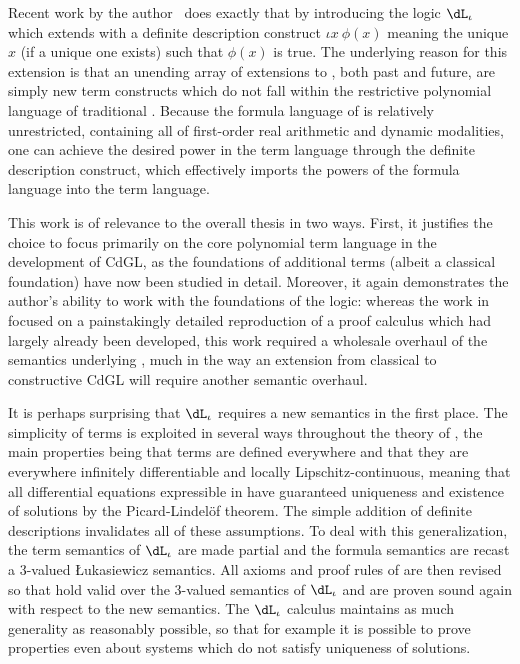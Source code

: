 \documentclass[12pt]{cmuthesis}
\theoremstyle{definition}
\theoremstyle{remark}
\newcommand{\meps}[2]{\iota{#1}~{#2}}
\newcommand{\rref}[2][]{\prettyref{#2}}
\newcommand{\CdGL}{\textsf{CdGL}\xspace}
\newcommand{\dLi}{\ensuremath{\dL_\iota}\xspace}
\begin{document}
Recent work by the author~\cite{hilbert-epsilons} does exactly that by introducing the logic \dLi which extends \dL with a definite description construct $\meps{x}{\phi(x)}$ meaning the unique $x$ (if a unique one exists) such that $\phi(x)$ is true.
The underlying reason for this extension is that an unending array of extensions to \dL, both past and future, are simply new term constructs which do not fall within the restrictive polynomial language of traditional \dL.
Because the formula language of \dL is relatively unrestricted, containing all of first-order real arithmetic and dynamic modalities, one can achieve the desired power in the term language through the definite description construct, which effectively imports the powers of the formula language into the term language.

This work is of relevance to the overall thesis in two ways.
First, it justifies the choice to focus primarily on the core polynomial term language in the development of \CdGL, as the foundations of additional terms (albeit a classical foundation) have now been studied in detail.
Moreover, it again demonstrates the author's ability to work with the foundations of the logic: whereas the work in \rref{sec:isabelle-fml} focused on a painstakingly detailed reproduction of a proof calculus which had largely already been developed, this work required a wholesale overhaul of the semantics underlying \dL, much in the way an extension from classical \dGL to constructive \CdGL will require another semantic overhaul.

It is perhaps surprising that \dLi requires a new semantics in the first place.
The simplicity of \dL terms is exploited in several ways throughout the theory of \dL, the main properties being that terms are defined everywhere and that they are everywhere infinitely differentiable and locally Lipschitz-continuous, meaning that all differential equations expressible in \dL have guaranteed uniqueness and existence of solutions by the Picard-Lindel\"of theorem.
The simple addition of definite descriptions invalidates all of these assumptions.
To deal with this generalization, the term semantics of \dLi are made partial and the formula semantics are recast a 3-valued {\L}ukasiewicz semantics.
All axioms and proof rules of \dL are then revised so that hold valid over the 3-valued semantics of \dLi and are proven sound again with respect to the new semantics.
The \dLi calculus maintains as much generality as reasonably possible, so that for example it is possible to prove properties even about systems which do not satisfy uniqueness of solutions.
\end{document}
